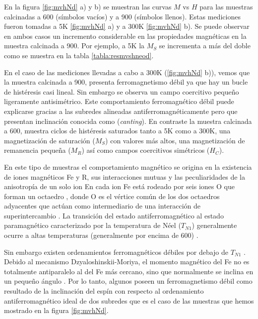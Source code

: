 \documentclass[../main.tex]{subfiles}
\begin{document}
En la figura \ref{fig:mvhNd} a) y b) se muestran las curvas $M$ vs $H$ para las muestras calcinadas a 600\gradoC{}  (símbolos vacíos) y a 900\gradoC{}  (símbolos llenos). Estas mediciones fueron tomadas a 5K \ref{fig:mvhNd} a) y a 300K \ref{fig:mvhNd} b). Se puede observar en ambos casos un incremento considerable en las propiedades magnéticas en la muestra calcinada a 900\gradoC{}. Por ejemplo, a 5K la $M_S$ se incrementa a más del doble como se muestra en la tabla \ref{tabla:resmvshneod}.
	
En el caso de las mediciones llevadas a cabo a 300K (\ref{fig:mvhNd} b)), vemos que la muestra calcinada a 900\gradoC, presenta ferromagnetismo débil ya que hay un bucle de histéresis casi lineal. Sin embargo se observa un campo coercitivo pequeño ligeramente antisimétrico. Este comportamiento ferromagnético débil puede explicarse gracias a las subredes  alineadas antiferromagnéticamente pero que presentan inclinación conocida como (\textit{canting}). En contraste la muestra calcinada a 600\gradoC{}, muestra ciclos de histéresis saturados tanto a 5K como a 300K, una magnetización de saturación ($M_S$) con valores más altos, una magnetización de remanencia pequeña ($M_R$) así como campos coercitivos simétricos ($H_C$).
	
En este tipo de muestras el comportamiento magnético se origina en la existencia de iones magnéticos Fe y R, sus interacciones mutuas y las peculiaridades de la anisotropía de un solo ion \cite{Zhou2014} En  cada ion Fe está rodeado por seis iones O que forman un octaedro , donde O es el vértice común de los dos octaedros adyacentes que actúan como intermediario de una interacción de superintercambio \cite{coey2010magnetism}. La transición del estado antiferromagnético al estado paramagnético caracterizado por la temperatura de Néel ($T_{N1}$) generalmente ocurre a altas temperaturas (generalmente por encima de 600\gradoC{}) \cite{Wang2019}.

Sin embargo existen ordenamientos ferromagnéticos débiles por debajo de $T_{N1}$ \cite{Bouziane2005}. Debido al mecanismo  Dzyaloshinskii-Moriya, el momento magnético del Fe no es totalmente antiparalelo al del Fe más cercano, sino que normalmente se inclina en un pequeño ángulo \cite{Dzyaloshinsky1958}. Por lo tanto, algunos  poseen un ferromagnetismo débil como resultado de la inclinación del espín con respecto al ordenamiento antiferromagnético ideal de dos subredes que es el caso de las muestras que hemos mostrado en la figura \ref{fig:mvhNd}.
\end{document}

